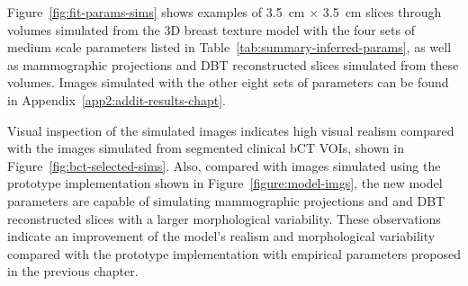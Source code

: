 \documentclass[journal]{IEEEtran}
\begin{document}
Figure~\ref{fig:fit-params-sims} shows examples of \SI{3.5}{\cm}
$\times$ \SI{3.5}{\cm} slices through volumes simulated from the 3D
breast texture model with the four sets of medium scale parameters
listed in Table~\ref{tab:summary-inferred-params}, as well as
mammographic projections and DBT reconstructed slices simulated from
these volumes. Images simulated with the other eight sets of
parameters can be found in Appendix~\ref{app2:addit-results-chapt}.

Visual inspection of the simulated images indicates high visual
realism compared with the images simulated from segmented clinical bCT
VOIs, shown in Figure~\ref{fig:bct-selected-sims}. Also, compared with
images simulated using the prototype implementation shown in
Figure~\ref{figure:model-imgs}, the new model parameters are capable
of simulating mammographic projections and and DBT reconstructed
slices with a larger morphological variability. These observations
indicate an improvement of the model's realism and morphological
variability compared with the prototype implementation with empirical
parameters proposed in the previous chapter.
\end{document}
